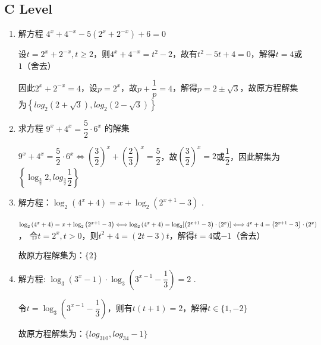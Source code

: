 \subsection*{C Level}
\begin{enumerate}
    \item 解方程 ${4}^{x} + {4}^{-x} - 5\left( {{2}^{x} + {2}^{-x}}\right)  + 6 = 0$
    \begin{jieda}
        设$t = {2}^{x} + {2}^{-x}, t \geq 2$，则${4}^{x} + {4}^{-x} = t^2 - 2$，故有$t^2-5t+4=0$，解得$t = 4$或$1$（舍去）

        因此${2}^{x} + {2}^{-x} = 4$，设$p = 2^x$，故$p + \dfrac{1}{p} = 4$，解得$p = 2 \pm \sqrt{3}$，故原方程解集为$\left\{log_2(2+\sqrt{3}), log_2(2-\sqrt{3})\right\}$
    \end{jieda}
    \item 求方程 ${9}^{x} + {4}^{x} = \dfrac{5}{2} \cdot  {6}^{x}$ 的解集
    \begin{jieda}
        ${9}^{x} + {4}^{x} = \dfrac{5}{2} \cdot  {6}^{x} \Longleftrightarrow \left(\dfrac{3}{2}\right)^x+\left(\dfrac{2}{3}\right)^x = \dfrac{5}{2}$，故$\left(\dfrac{3}{2}\right)^x = 2$或$\dfrac{1}{2}$，因此解集为$\left\{\log_{\frac{3}{2}}2, log_{\frac{3}{2}}\dfrac{1}{2}\right\}$
    \end{jieda}
    
    \item 解方程：${\log }_{2}\left( {{4}^{x} + 4}\right)  = x + {\log }_{2}\left( {{2}^{x + 1} - 3}\right)$ .
    \begin{jieda}
        ${\log }_{2}\left( {{4}^{x} + 4}\right)  = x + {\log }_{2}\left( {{2}^{x + 1} - 3}\right) \Longleftrightarrow {\log }_{2}\left( {{4}^{x} + 4}\right)  = {\log }_{2}[\left( {{2}^{x + 1} - 3}\right)\cdot \left(2^x\right)] \\
        \Longleftrightarrow 4^x+4 = \left( {{2}^{x + 1} - 3}\right)\cdot \left(2^x\right)$， 令$t = 2^x, t > 0$，则$t^2+4 = (2t-3)t$，解得$t = 4$或$-1$（舍去）
    
        故原方程解集为：$\{2\}$
    \end{jieda}
    
    \item 解方程: ${\log }_{3}\left( {{3}^{x} - 1}\right)  \cdot  {\log }_{3}\left( {{3}^{x - 1} - \dfrac{1}{3}}\right)  = 2$ .
    \begin{jieda}
        令$t = {\log }_{3}\left( {{3}^{x - 1} - \dfrac{1}{3}}\right)$，则有$t(t+1) = 2$，解得$t \in \{1, -2\}$
        
        故原方程解集为：$\{log_310, log_34 - 1\}$
    \end{jieda}
\end{enumerate}
